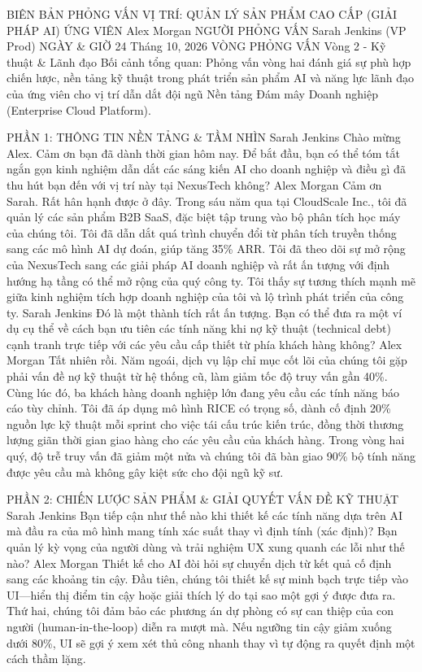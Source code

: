 \documentclass[12pt]{article}
\begin{document}
BIÊN BẢN PHỎNG VẤN
VỊ TRÍ: QUẢN LÝ SẢN PHẨM CAO CẤP (GIẢI PHÁP AI)
ỨNG VIÊN
Alex Morgan
NGƯỜI PHỎNG VẤN
Sarah Jenkins (VP Prod)
NGÀY \& GIỜ
24 Tháng 10, 2026
VÒNG PHỎNG VẤN
Vòng 2 - Kỹ thuật \&
Lãnh đạo
Bối cảnh tổng quan: Phỏng vấn vòng hai đánh giá sự phù hợp chiến lược, nền tảng kỹ thuật trong phát triển sản phẩm AI và năng lực lãnh đạo của ứng viên cho vị trí dẫn dắt đội ngũ Nền tảng Đám mây Doanh nghiệp (Enterprise Cloud Platform).

PHẦN 1: THÔNG TIN NỀN TẢNG \& TẦM NHÌN
Sarah Jenkins
Chào mừng Alex. Cảm ơn bạn đã dành thời gian hôm nay. Để bắt đầu, bạn có thể tóm tắt ngắn gọn kinh nghiệm dẫn dắt các sáng kiến AI cho doanh nghiệp và điều gì đã thu hút bạn đến với vị trí này tại NexusTech không?
Alex Morgan
Cảm ơn Sarah. Rất hân hạnh được ở đây. Trong sáu năm qua tại CloudScale Inc., tôi đã quản lý các sản phẩm B2B SaaS, đặc biệt tập trung vào bộ phân tích học máy của chúng tôi. Tôi đã dẫn dắt quá trình chuyển đổi từ phân tích truyền thống sang các mô hình AI dự đoán, giúp tăng 35\% ARR. Tôi đã theo dõi sự mở rộng của NexusTech sang các giải pháp AI doanh nghiệp và rất ấn tượng với định hướng hạ tầng có thể mở rộng của quý công ty. Tôi thấy sự tương thích mạnh mẽ giữa kinh nghiệm tích hợp doanh nghiệp của tôi và lộ trình phát triển của công ty.
Sarah Jenkins
Đó là một thành tích rất ấn tượng. Bạn có thể đưa ra một ví dụ cụ thể về cách bạn ưu tiên các tính năng khi nợ kỹ thuật (technical debt) cạnh tranh trực tiếp với các yêu cầu cấp thiết từ phía khách hàng không?
Alex Morgan
Tất nhiên rồi. Năm ngoái, dịch vụ lập chỉ mục cốt lõi của chúng tôi gặp phải vấn đề nợ kỹ thuật từ hệ thống cũ, làm giảm tốc độ truy vấn gần 40\%. Cùng lúc đó, ba khách hàng doanh nghiệp lớn đang yêu cầu các tính năng báo cáo tùy chỉnh. Tôi đã áp dụng mô hình RICE có trọng số, dành cố định 20\% nguồn lực kỹ thuật mỗi sprint cho việc tái cấu trúc kiến trúc, đồng thời thương lượng giãn thời gian giao hàng cho các yêu cầu của khách hàng. Trong vòng hai quý, độ trễ truy vấn đã giảm một nửa và chúng tôi đã bàn giao 90\% bộ tính năng được yêu cầu mà không gây kiệt sức cho đội ngũ kỹ sư.

PHẦN 2: CHIẾN LƯỢC SẢN PHẨM \& GIẢI QUYẾT VẤN ĐỀ KỸ THUẬT
Sarah Jenkins
Bạn tiếp cận như thế nào khi thiết kế các tính năng dựa trên AI mà đầu ra của mô hình mang tính xác suất thay vì định tính (xác định)? Bạn quản lý kỳ vọng của người dùng và trải nghiệm UX xung quanh các lỗi như thế nào?
Alex Morgan
Thiết kế cho AI đòi hỏi sự chuyển dịch từ kết quả cố định sang các khoảng tin cậy. Đầu tiên, chúng tôi thiết kế sự minh bạch trực tiếp vào UI—hiển thị điểm tin cậy hoặc giải thích lý do tại sao một gợi ý được đưa ra. Thứ hai, chúng tôi đảm bảo các phương án dự phòng có sự can thiệp của con người (human-in-the-loop) diễn ra mượt mà. Nếu ngưỡng tin cậy giảm xuống dưới 80\%, UI sẽ gợi ý xem xét thủ công nhanh thay vì tự động ra quyết định một cách thầm lặng.
\end{document}
